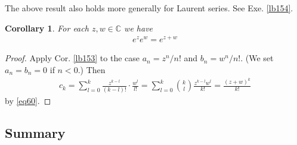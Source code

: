 \documentclass[12pt,b5paper,notitlepage]{article}
\theoremstyle{definition}
\theoremstyle{plain}
\newtheorem{co}[df]{Corollary}
\newcommand{\Cbb}{\mathbb C}
\numberwithin{equation}{section}
\begin{document}
The above result also holds more generally for Laurent series. See Exe. \ref{lb154}.

\begin{co}\label{lb215}
For each $z,w\in\Cbb$ we have 
\begin{align*}
e^ze^w=e^{z+w}
\end{align*}
\end{co}

\begin{proof}
Apply Cor. \ref{lb153} to the case $a_n=z^n/n!$ and $b_n=w^n/n!$. (We set $a_n=b_n=0$ if $n<0$.) Then
\begin{align*}
c_k=\sum_{l=0}^{k} \frac{z^{k-l}}{(k-l)!}\cdot\frac{w^l}{l!}=\sum_{l=0}^k {k\choose l}\frac{z^{k-l}w^l}{k!}=\frac{(z+w)^k}{k!}
\end{align*}
by \eqref{eq60}.
\end{proof}




\subsection{Summary}
\end{document}
